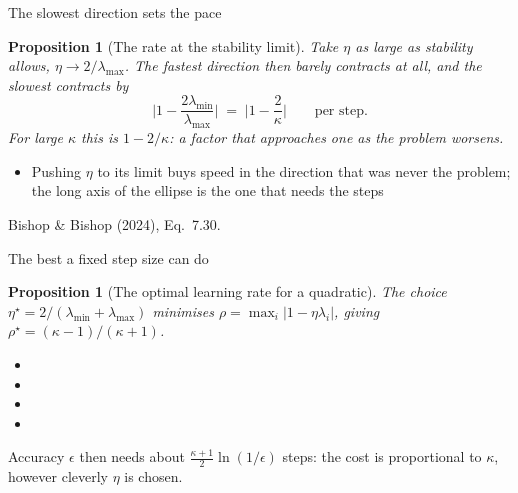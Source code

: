 \documentclass[aspectratio=169, 11pt]{beamer}
\newtheorem{propx}[theorem]{Proposition}
\newcommand{\srcline}[1]{%
  \par\vspace{0.25em}%
  {\scriptsize\color{mcMuted}\hfill #1\par}}
\newcommand{\src}[3]{}      %
\begin{document}
\begin{frame}{The slowest direction sets the pace}
  \src{bishop2024}{equation}{7.30}
  \src{bishop2024}{section}{7.3}
  \vspace{-0.2em}
  \begin{propx}[The rate at the stability limit]\label{th:slow}
    \small
    Take $\eta$ as large as stability allows,
    $\eta \to 2/\lambda_{\max}$. The fastest direction then barely
    contracts at all, and the slowest contracts by
    \[
      \Big| 1 - \frac{2\lambda_{\min}}{\lambda_{\max}} \Big|
      \;=\; \Big| 1 - \frac{2}{\kappa} \Big|
      \qquad\text{per step.}
    \]
    For large $\kappa$ this is $1 - 2/\kappa$: a factor that approaches
    one as the problem worsens.
  \end{propx}
  \vspace{0.3em}
  \begin{itemize}\itemsep0.35em
    \item Pushing $\eta$ to its limit buys speed in the direction that
          was never the problem; the long axis of the ellipse is the one
          that needs the steps
  \end{itemize}
  \srcline{Bishop \& Bishop (2024), Eq.~7.30.}
\end{frame}

\begin{frame}{The best a fixed step size can do}
  \src{polyak1964}{section}{2}
  \vspace{-0.2em}
  \begin{propx}[The optimal learning rate for a quadratic]\label{th:opt}
    \small
    The choice $\eta^\star = 2/(\lambda_{\min} + \lambda_{\max})$
    minimises $\rho = \max_i |1 - \eta\lambda_i|$, giving
    $\rho^\star = (\kappa - 1)/(\kappa + 1)$.
  \end{propx}
  \vspace{0.05em}
  {\footnotesize
  \begin{itemize}\itemsep0.26em
    \item {}
    \item {}
    \item {}
    \item {}
  \end{itemize}}
  \vspace{-0.4em}
  \begin{redhighlight}
    Accuracy $\epsilon$ then needs about
    $\tfrac{\kappa+1}{2}\ln(1/\epsilon)$ steps: the cost is
    \alert{proportional to $\kappa$}, however cleverly $\eta$ is chosen.
  \end{redhighlight}
\end{frame}
\end{document}
